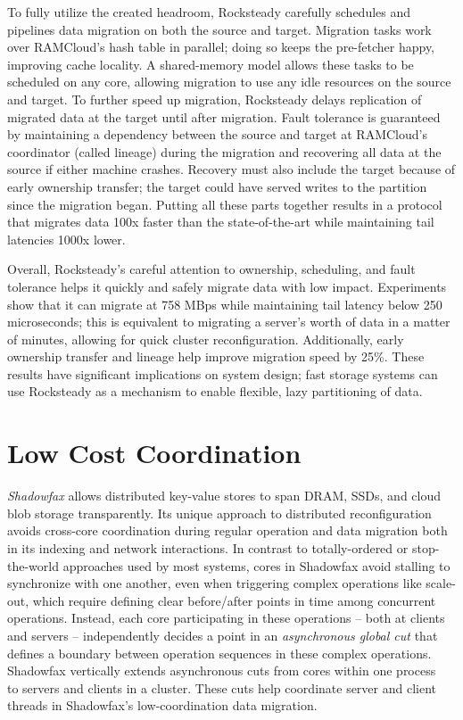 To fully utilize the created headroom, Rocksteady carefully schedules and
pipelines data migration on both the source and target.
%
Migration tasks work over RAMCloud’s hash table in parallel;
doing so keeps the pre-fetcher happy, improving cache locality.
%
A shared-memory model allows these tasks to be scheduled on any core,
allowing migration to use any idle resources on the source and target.
%
To further speed up migration, Rocksteady delays
replication of migrated data at the target until after migration.
%
Fault tolerance is guaranteed by maintaining a dependency
between the source and target at RAMCloud’s coordinator (called lineage)
during the migration and recovering all data at the source if either
machine crashes.
%
Recovery must also include the target because of early
ownership transfer; the target could have served writes
to the partition since the migration began.
%
Putting all these parts
together results in a protocol that migrates data 100x faster than the
state-of-the-art while maintaining tail latencies 1000x lower.

Overall, Rocksteady's careful attention to ownership, scheduling, and
fault tolerance helps it quickly and safely migrate data with
low impact.
%
Experiments show that it can migrate at 758 MBps
while maintaining tail latency below 250 microseconds; this is
equivalent to migrating a server's worth of data in a matter of minutes,
allowing for quick cluster reconfiguration.
%
Additionally, early ownership transfer and
lineage help improve migration speed by 25\%.
%
These results have
significant implications on system design; fast storage systems can use
Rocksteady as a mechanism to enable flexible, lazy partitioning of
data.

\section{Low Cost Coordination}

\emph{Shadowfax} allows distributed key-value stores to
span DRAM, SSDs, and cloud blob storage transparently.
%
Its unique approach to
distributed reconfiguration avoids cross-core coordination during
regular operation and data migration both in its indexing and network
interactions.
%
In contrast to totally-ordered or stop-the-world approaches used by most
systems, cores in Shadowfax avoid stalling to synchronize with one another, even when
triggering complex operations like scale-out, which require
defining clear before/after points in time among concurrent operations.
%
Instead, each core participating in these operations -- both at clients and
servers -- independently decides a point in an \emph{asynchronous global
cut} that defines a boundary between operation sequences in these complex operations.
%
Shadowfax vertically extends asynchronous cuts from cores within one
process~\cite{faster} to servers
and clients in a cluster.
%
These cuts help coordinate server
and client threads
in Shadowfax's low-coordination data migration.

